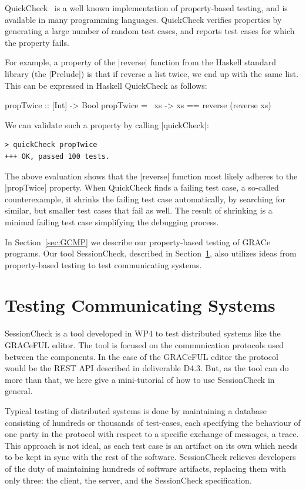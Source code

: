 \documentclass{article}
\begin{document}
QuickCheck~\cite{QuickCheck} is a well known implementation of property-based
testing, and is available in many programming languages.  QuickCheck verifies
properties by generating a large number of random test cases, and reports test
cases for which the property fails. 

For example, a property of the |reverse| function from the Haskell standard
library (the |Prelude|) is that if reverse a list twice, we end up with the same
list. This can be expressed in Haskell QuickCheck as follows:
\begin{haskellcode}
propTwice :: [Int] -> Bool
propTwice = \ xs -> xs == reverse (reverse xs)
\end{haskellcode}
We can validate such a property by calling |quickCheck|:
\begin{verbatim}
> quickCheck propTwice
+++ OK, passed 100 tests.
\end{verbatim}
The above evaluation shows that the |reverse| function most likely adheres to
the |propTwice| property. When QuickCheck finds a failing test case, a so-called
counterexample, it shrinks the failing test case automatically, by searching for
similar, but smaller test cases that fail as well. The result of shrinking is a
minimal failing test case simplifying the debugging process. 

In Section~\ref{sec:GCMP} we describe our property-based testing of GRACe programs. 
Our tool SessionCheck, described in
Section~\ref{sec:SessionCheck}, also utilizes ideas from property-based testing
to test communicating systems.
\section{Testing Communicating Systems}
\label{sec:SessionCheck}
%
SessionCheck \cite{SessionCheck} is a tool developed in WP4 to test distributed systems like
the GRACeFUL editor.
%
The tool is focused on the communication protocols used between the components.
%
In the case of the GRACeFUL editor the protocol would be the REST API described in deliverable D4.3. %
%
But, as the tool can do more than that, we here give a mini-tutorial
of how to use SessionCheck in general.

Typical testing of distributed systems is done by maintaining a database consisting of hundreds
or thousands of test-cases, each specifying the behaviour of one party in the protocol with
respect to a specific exchange of messages, a trace.
%
This approach is not ideal, as each test case is an artifact on its own which needs to be kept
in sync with the rest of the software.
%
SessionCheck relieves developers of the duty of maintaining hundreds of software
artifacts, replacing them with only three: the client, the server, and the SessionCheck specification.
\end{document}
